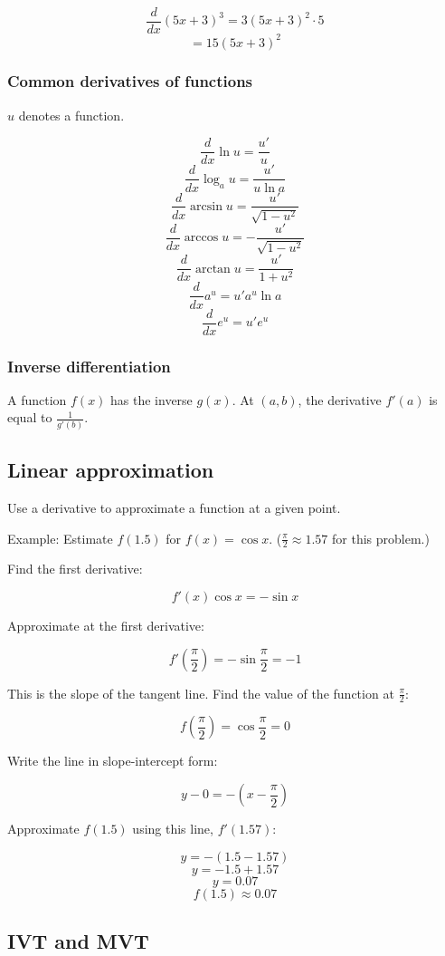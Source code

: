 \documentclass[letterpaper, 12pt]{article}
\begin{document}
$$\frac{d}{dx}(5x+3)^3 = 3(5x+3)^2 \cdot 5$$
$$ = \boxed{15(5x+3)^2}$$

\subsubsection*{Common derivatives of functions}
$u$ denotes a function.

$$\frac{d}{dx}  \ln u= \frac{u'}{u}$$
$$\frac{d}{dx}  \log_a u= \frac{u'}{u \ln a}$$
$$\frac{d}{dx}  \arcsin u= \frac{u'}{\sqrt{1-u^2}}$$
$$\frac{d}{dx}  \arccos u= -\frac{u'}{\sqrt{1-u^2}}$$
$$\frac{d}{dx}  \arctan u= \frac{u'}{1+u^2}$$
$$\frac{d}{dx}  a^u= u'a^u \ln a$$
$$\frac{d}{dx}  e^u= u'e^u$$

\subsubsection*{Inverse differentiation}
A function $f(x)$ has the inverse $g(x)$. At $(a, b)$, the derivative $f'(a)$ is equal to $\displaystyle\frac{1}{g'(b)}$.

\subsection*{Linear approximation}
Use a derivative to approximate a function at a given point.

Example: Estimate $f(1.5)$ for $f(x) = \cos x$. ($\frac{\pi}{2} \approx 1.57$ for this problem.)

Find the first derivative:

$$f'(x) \cos x = - \sin x$$

Approximate at the first derivative:

$$f'\left(\frac{\pi}{2}\right) = - \sin \frac{\pi}{2} = -1 $$

This is the slope of the tangent line. Find the value of the function at $\displaystyle \frac{\pi}{2}$:

$$f\left(\frac{\pi}{2}\right) = \cos \frac{\pi}{2} = 0$$

Write the line in slope-intercept form:

$$ y - 0 = -\left(x- \frac{\pi}{2}\right) $$

Approximate $f(1.5)$ using this line, $f'(1.57)$:

$$y = -(1.5 - 1.57)$$
$$ y = -1.5 + 1.57 $$
$$ y = 0.07 $$
$$ \boxed{f(1.5) \approx 0.07} $$

\subsection*{IVT and MVT}
\end{document}
